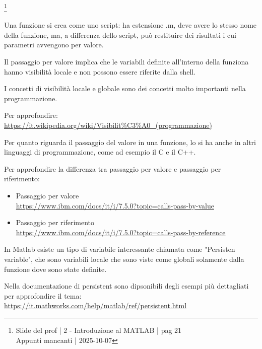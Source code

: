 \footnote{ 
    Slide del prof | 2 - Introduzione al MATLAB | pag 21\\
    Appunti mancanti | 2025-10-07 
}

Una funzione si crea come uno script: ha estensione .m, deve avere lo stesso nome della funzione, 
ma, a differenza dello script, può restituire dei risultati i cui parametri avvengono per valore. \newline 

Il passaggio per valore implica che le variabili definite all'interno della funziona hanno visibilità locale e non possono essere riferite dalla shell. \newline 

\begin{tcolorbox}
    I concetti di visibilità locale e globale sono dei concetti molto importanti nella programmazione. \newline 

    Per approfondire: \url{https://it.wikipedia.org/wiki/Visibilit%C3%A0_(programmazione)} \newline 

    Per quanto riguarda il passaggio del valore in una funzione, lo si ha anche in altri linguaggi di programmazione, come ad esempio il C e il C++. \newline 

    Per approfondire la differenza tra passaggio per valore e passaggio per riferimento: 
    
    \begin{itemize}
        \item Passaggio per valore \\ \url{https://www.ibm.com/docs/it/i/7.5.0?topic=calls-pass-by-value}
        \item Passaggio per riferimento \\ \url{https://www.ibm.com/docs/it/i/7.5.0?topic=calls-pass-by-reference}
    \end{itemize}
    
\end{tcolorbox}

In Matlab esiste un tipo di variabile interessante chiamata come "Persisten variable", 
che sono variabili locale che sono viste come globali solamente dalla funzione dove sono state definite. \newline 

\begin{tcolorbox}
    Nella documentazione di persistent sono dipsonibili degli esempi più dettagliati per approfondire il tema: 
    \url{https://it.mathworks.com/help/matlab/ref/persistent.html}
\end{tcolorbox}

